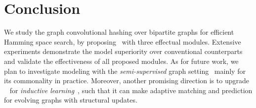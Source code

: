 \section{\textbf{Conclusion}}
\label{sec:con}
We study the graph convolutional hashing over bipartite graphs for efficient Hamming space search, by proposing \model~with three effectual modules.
Extensive experiments demonstrate the model superiority over conventional counterparts and validate the effectiveness of all proposed modules. 
As for future work, we plan to investigate modeling with the \textit{semi-supervised} graph setting~\cite{zixing1,zixing2} mainly for its commonality in practice. 
Moreover, another promising direction is to upgrade \model~ for \textit{inductive learning}~\cite{graphsage}, such that it can make adaptive matching and prediction for evolving graphs with structural updates.






